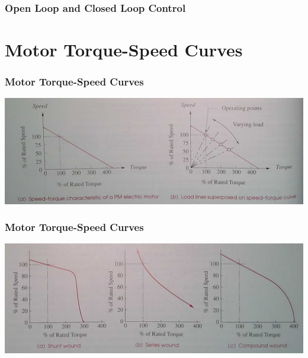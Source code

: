 \documentclass[fleqn]{beamer} %
\newcommand{\sectiontitleII}{Open Loop and Closed Loop Control}
\newcommand{\sectiontitleIII}{Motor Torque-Speed Curves}
\begin{document}
	\begin{frame}[label=sectionI] \small
		\frametitle{\sectiontitleII}

	\end{frame}

\section{\sectiontitleIII}	

	\begin{frame}[label=sectionIII] \small
		\frametitle{\sectiontitleIII}
	 		

		\includegraphics[scale=.25]{images/torque_speed_permanent_magnet.png}

	        
		\end{frame}  

	\begin{frame}[label=sectionIII] \small
		\frametitle{\sectiontitleIII}
	 		

		\includegraphics[scale=.25]{images/torque_speed_various.png}

	        
		\end{frame}  
\end{document}
